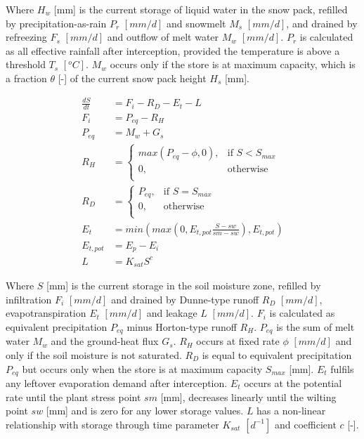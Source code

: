 Where $H_w$ [mm] is the current storage of liquid water in the snow pack, refilled by precipitation-as-rain $P_r$ $[mm/d]$ and snowmelt $M_s$ $[mm/d]$, and drained by refreezing $F_s$ $[mm/d]$ and outflow of melt water $M_w$ $[mm/d]$.
$P_r$ is calculated as all effective rainfall after interception, provided the temperature is above a threshold $T_s$ $[^oC]$.
$M_w$ occurs only if the store is at maximum capacity, which is a fraction $\theta$ [-] of the current snow pack height $H_s$ [mm].

\begin{align}
	\frac{dS}{dt} &= F_i - R_D -E_t -L \\
	F_i &= P_{eq} - R_H\\
	P_{eq} &= M_w+G_s\\
	R_H &= \begin{cases}
		max(P_{eq}-\phi,0), &\text{if } S < S_{max} \\
		0, & \text{otherwise} \\
	\end{cases} \\
	R_D &= \begin{cases}
		P_{eq}, &\text{if } S = S_{max} \\
		0, & \text{otherwise} \\
	\end{cases} \\
	E_t &= min\left(max\left(0,E_{t,pot}\frac{S-sw}{sm -sw}\right), E_{t,pot}\right)\\
	E_{t,pot} &= E_p - E_i\\
	L &= K_{sat}S^c
\end{align}

Where $S$ [mm] is the current storage in the soil moisture zone, refilled by infiltration $F_i$ $[mm/d]$ and drained by Dunne-type runoff $R_D$ $[mm/d]$, evapotranspiration $E_t$ $[mm/d]$ and leakage $L$ $[mm/d]$.
$F_i$ is calculated as equivalent precipitation $P_{eq}$ minus Horton-type runoff $R_H$. 
$P_{eq}$ is the sum of melt water $M_w$ and the ground-heat flux $G_s$. 
$R_H$ occurs at fixed rate $\phi$ $[mm/d]$ and only if the soil moisture is not saturated.
$R_D$ is equal to equivalent precipitation $P_{eq}$ but occurs only when the store is at maximum capacity $S_{max}$ [mm].
$E_t$ fulfils any leftover evaporation demand after interception. 
$ E_t$ occurs at the potential rate until the plant stress point $sm$ [mm], decreases linearly until the wilting point $sw$ [mm] and is zero for any lower storage values.
$L$ has a non-linear relationship with storage through time parameter $K_{sat}$ $[d^{-1}]$ and coefficient $c$ [-].

